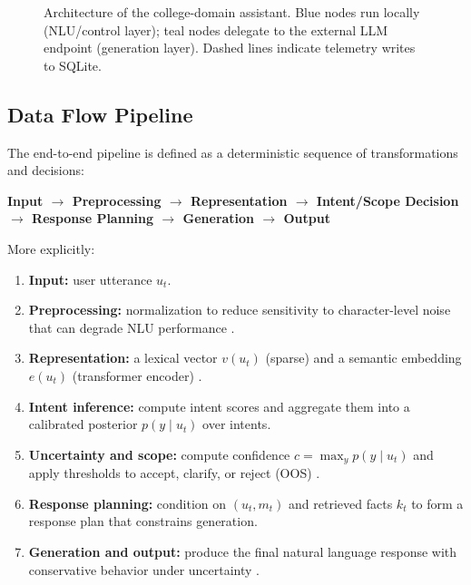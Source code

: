 \documentclass[12pt,onecolumn]{report}
\begin{document}
\begin{figure}[t]
\caption{Architecture of the college-domain assistant. Blue nodes run locally
(NLU/control layer); teal nodes delegate to the external LLM endpoint
(generation layer). Dashed lines indicate telemetry writes to SQLite.}
\label{fig:architecture}
\end{figure}

\subsection{Data Flow Pipeline}
The end-to-end pipeline is defined as a deterministic sequence of transformations and decisions:
\begin{center}
\textbf{Input $\rightarrow$ Preprocessing $\rightarrow$ Representation $\rightarrow$ Intent/Scope Decision $\rightarrow$ Response Planning $\rightarrow$ Generation $\rightarrow$ Output}
\end{center}

More explicitly:
\begin{enumerate}
	\item \textbf{Input:} user utterance $u_t$.
	\item \textbf{Preprocessing:} normalization to reduce sensitivity to character-level noise that can degrade NLU performance \cite{belinkov2018synthetic,sun2020adversarial}.
	\item \textbf{Representation:} a lexical vector $v(u_t)$ (sparse) and a semantic embedding $e(u_t)$ (transformer encoder) \cite{devlin2019bert,liu2019roberta}.
	\item \textbf{Intent inference:} compute intent scores and aggregate them into a calibrated posterior $p(y\mid u_t)$ over intents.
	\item \textbf{Uncertainty and scope:} compute confidence $c=\max_y p(y\mid u_t)$ and apply thresholds to accept, clarify, or reject (OOS) \cite{larson2019clinc150,casanueva2020banking77}.
	\item \textbf{Response planning:} condition on $(u_t,m_t)$ and retrieved facts $k_t$ to form a response plan that constrains generation.
	\item \textbf{Generation and output:} produce the final natural language response with conservative behavior under uncertainty \cite{radford2019gpt2,ouyang2022rlhf,thoppilan2022lamda}.
\end{enumerate}
\end{document}
